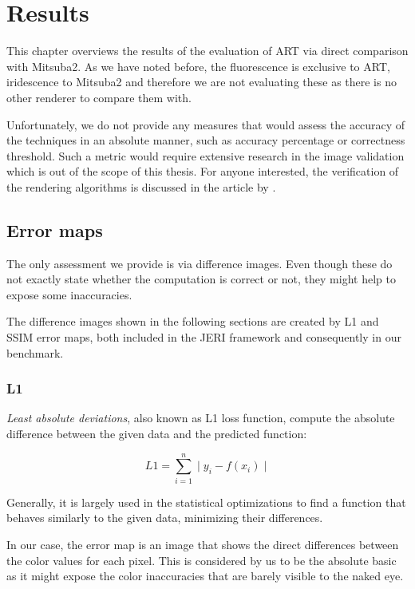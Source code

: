 \chapter{Results}
\label{chap:results}

This chapter overviews the results of the evaluation of ART via direct comparison with Mitsuba2. As we have noted before, the fluorescence is exclusive to ART, iridescence to Mitsuba2 and therefore we are not evaluating these as there is no other renderer to compare them with.

Unfortunately, we do not provide any measures that would assess the accuracy of the techniques in an absolute manner, such as accuracy percentage or correctness threshold. Such a metric would require extensive research in the image validation which is out of the scope of this thesis. For anyone interested, the verification of the rendering algorithms is discussed in the article by \citet{ulbricht2006verification}.

\section{Error maps}

The only assessment we provide is via difference images. Even though these do not exactly state whether the computation is correct or not, they might help to expose some inaccuracies.

The difference images shown in the following sections are created by L1 and SSIM error maps, both included in the JERI framework and consequently in our benchmark. 

\subsection{L1}

\emph{Least absolute deviations}, also known as L1 loss function, compute the absolute difference between the given data and the predicted function:

\begin{equation}
L1=\sum_{i=1}^{n}\mid y_i - f(x_i) \mid
\end{equation}

Generally, it is largely used in the statistical optimizations to find a function that behaves similarly to the given data, minimizing their differences.

In our case, the error map is an image that shows the direct differences between the color values for each pixel. This is considered by us to be the absolute basic as it might expose the color inaccuracies that are barely visible to the naked eye.

